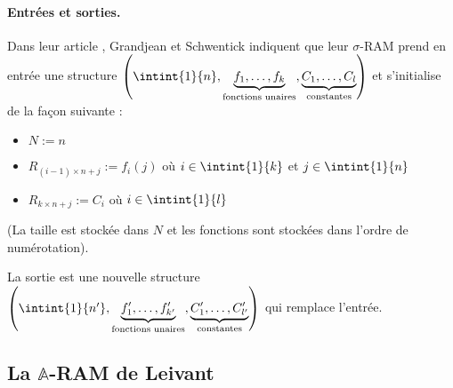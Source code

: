 \documentclass{report}
\newcommand{\bbA}{\mathbb{A}}
\begin{document}
		
			\paragraph{Entrées et sorties.}
			Dans leur article \cite{GrandjeanSchwentick2002}, Grandjean et Schwentick indiquent que leur $\sigma$-RAM prend en entrée une structure $\left( \intint{1}{n}, \underset{\text{fonctions unaires}}{\underbrace{f_1, \dots, f_k}},  \underset{\text{constantes}}{\underbrace{C_1, \dots, C_l}}\right)$ et s'initialise de la façon suivante : 
			
			\begin{itemize}[itemsep=-1mm]
				\item 	$N := n$
				\item 	$R_{(i-1) \times n + j} := f_i(j)$ où $i \in \intint{1}{k}$ et $j \in \intint{1}{n}$
				\item 	$R_{k \times n + j} := C_i$ où $i \in \intint{1}{l}$
			\end{itemize}
			(La taille est stockée dans $N$ et les fonctions sont stockées dans l'ordre de numérotation).
			
			La sortie est une nouvelle structure $\left( \intint{1}{n'}, \underset{\text{fonctions unaires}}{\underbrace{f'_1, \dots, f'_{k'}}},  \underset{\text{constantes}}{\underbrace{C'_1, \dots, C'_{l'}}}\right)$ qui remplace l'entrée.
		
		
		
		\subsection{La $\bbA$-RAM de Leivant}
		\label{subsec:A_RAM_de_Leivant}
		
\end{document}
